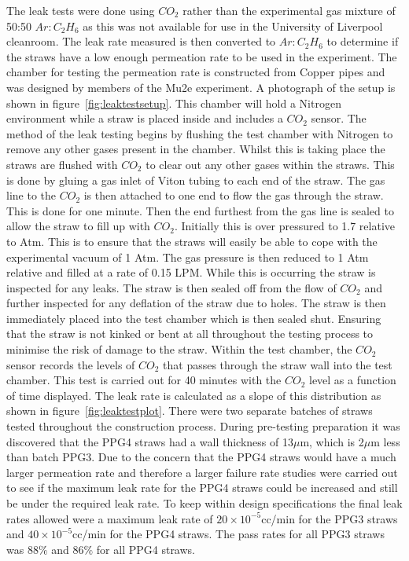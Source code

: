 The leak tests were done using $CO_{2}$ rather than the experimental gas mixture of 50:50 $Ar:C_{2}H_{6}$ as this was not available for use in the University of Liverpool cleanroom. The leak rate measured is then converted to $Ar:C_{2}H_{6}$ to determine if the straws have a low enough permeation rate to be used in the experiment. The chamber for testing the permeation rate is constructed from Copper pipes and was designed by members of the Mu2e experiment. A photograph of the setup is shown in figure~\ref{fig:leaktestsetup}. This chamber will hold a Nitrogen environment while a straw is placed inside and includes a $CO_{2}$ sensor. The method of the leak testing begins by flushing the test chamber with Nitrogen to remove any other gases present in the chamber. Whilst this is taking place the straws are flushed with $CO_{2}$ to clear out any other gases within the straws. This is done by gluing a gas inlet of Viton tubing to each end of the straw. The gas line to the $CO_{2}$ is then attached to one end to flow the gas through the straw. This is done for one minute. Then the end furthest from the gas line is sealed to allow the straw to fill up with $CO_{2}$. Initially this is over pressured to 1.7 relative to Atm. This is to ensure that the straws will easily be able to cope with the experimental vacuum of 1 Atm. The gas pressure is then reduced to 1 Atm relative and filled at a rate of 0.15 LPM. While this is occurring the straw is inspected for any leaks. The straw is then sealed off from the flow of $CO_{2}$ and further inspected for any deflation of the straw due to holes. The straw is then immediately placed into the test chamber which is then sealed shut. Ensuring that the straw is not kinked or bent at all throughout the testing process to minimise the risk of damage to the straw. Within the test chamber, the $CO_{2}$ sensor records the levels of $CO_{2}$ that passes through the straw wall into the test chamber. This test is carried out for 40 minutes with the $CO_{2}$ level as a function of time displayed. The leak rate is calculated as a slope of this distribution as shown in figure~\ref{fig:leaktestplot}. There were two separate batches of straws tested throughout the construction process. During pre-testing preparation it was discovered that the PPG4 straws had a wall thickness of 13$\mu$m, which is 2$\mu$m less than batch PPG3. Due to the concern that the PPG4 straws would have a much larger permeation rate and therefore a larger failure rate studies were carried out to see if the maximum leak rate for the PPG4 straws could be increased and still be under the required leak rate. To keep within design specifications the final leak rates allowed were a maximum leak rate of $20\times10^{-5}$cc/min for the PPG3 straws and $40\times10^{-5}$cc/min for the PPG4 straws. The pass rates for all PPG3 straws was 88$\%$ and 86$\%$ for all PPG4 straws.

